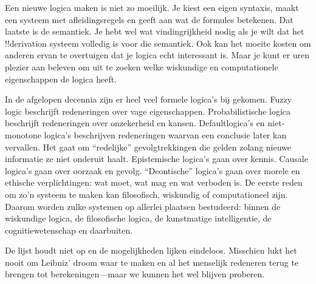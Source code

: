 \documentclass[openany]{memoir}
\begin{document}
\begingroup
\def\olfilename{OLP-0181}
\def\olfilepath{content/first-order-logic/beyond/}
\hypertarget{unit-OLP-0181}{}





Een nieuwe logica maken is niet zo moeilijk. Je kiest een eigen syntaxis, maakt
een systeem met afleidingsregels en geeft aan wat de formules betekenen. Dat
laatste is de semantiek. Je hebt wel wat vindingrijkheid nodig als je wilt dat
het !!{derivation} systeem volledig is voor die semantiek. Ook kan het moeite
kosten om anderen ervan te overtuigen dat je logica echt interessant is. Maar
je kunt er uren plezier aan beleven om uit te zoeken welke wiskundige en
computationele eigenschappen de logica heeft.

In de afgelopen decennia zijn er heel veel formele logica's bij gekomen. Fuzzy
logic beschrijft redeneringen over vage eigenschappen. Probabilistische logica
beschrijft redeneringen over onzekerheid en kansen. Defaultlogica's en
niet-monotone logica's beschrijven redeneringen waarvan een conclusie later kan
vervallen. Het gaat om ``redelijke'' gevolgtrekkingen die gelden zolang nieuwe
informatie ze niet onderuit haalt. Epistemische logica's gaan over kennis.
Causale logica's gaan over oorzaak en gevolg. ``Deontische'' logica's gaan over
morele en ethische verplichtingen: wat moet, wat mag en wat verboden is. De
eerste reden om zo'n systeem te maken kan filosofisch, wiskundig of
computationeel zijn. Daarom worden zulke systemen op allerlei plaatsen
bestudeerd: binnen de wiskundige logica, de filosofische logica, de kunstmatige
intelligentie, de cognitiewetenschap en daarbuiten.

De lijst houdt niet op en de mogelijkheden lijken eindeloos. Misschien lukt het
nooit om Leibniz' droom waar te maken en al het menselijk redeneren terug te
brengen tot berekeningen---maar we kunnen het wel blijven proberen.
\endgroup
\OLEndChapterHook
\OLEndPartHook

\begingroup
\def\olfilename{OLP-0182}
\def\olfilepath{content/model-theory/}
\hypertarget{unit-OLP-0182}{}
\end{document}
